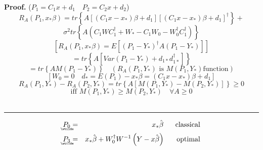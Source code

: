 \documentclass{article}
\newenvironment{proof}[1][Proof]{\noindent\textbf{#1.} }{\ \rule{0.5em}{0.5em}}
\begin{document}
\begin{proof}
($P_{1}=C_{1}x+d_{1}\quad P_{2}=C_{2}x+d_{2}$)%
\begin{equation*}
R_{A}\left( P_{1},x_{\ast }\beta \right) =tr\left\{ A\left[ \left(
C_{1}x-x_{\ast }\right) \beta +d_{1}\right] \left[ \left( C_{1}x-x_{\ast
}\right) \beta +d_{1}\right] ^{\dagger }\right\} +
\end{equation*}%
\begin{equation*}
\sigma ^{2}tr\left\{ A\left( C_{1}WC_{1}^{\dagger }+W_{\ast
}-C_{1}W_{0}-W_{0}^{\dagger }C_{1}^{\dagger }\right) \right\}
\end{equation*}%
\begin{equation*}
\left[ R_{A}\left( P_{1},x_{\ast }\beta \right) =E\left[ \left(
P_{1}-Y_{\ast }\right) ^{\dagger }A\left( P_{1}-Y_{\ast }\right) \right] %
\right]
\end{equation*}%
\begin{equation*}
=tr\left\{ A\left[ Var\left( P_{1}-Y_{\ast }\right) +d_{1\ast }d_{1\ast
}^{\dagger }\right] \right\}
\end{equation*}%
\begin{equation*}
=tr\left\{ AM\left( P_{1}-Y_{\ast }\right) \right\} \quad \left( R_{A}\left(
P_{1},Y_{\ast }\right) \text{ is }M\left( P_{1},Y_{\ast }\right) \text{
function}\right)
\end{equation*}%
\begin{equation*}
\left[ W_{0}=0\quad d_{\ast }=E\left( P_{1}\right) -x_{\ast }\beta =\left(
C_{1}x-x_{\ast }\right) \beta +d_{1}\right]
\end{equation*}%
\begin{equation*}
R_{A}\left( P_{1},Y_{\ast }\right) -R_{A}\left( P_{2},Y_{\ast }\right)
=tr\left\{ A\left[ M\left( P_{1},Y_{\ast }\right) -M\left( P_{2},Y_{\ast
}\right) \right] \right\} \geq 0
\end{equation*}%
\begin{equation*}
\text{iff }M\left( P_{1},Y_{\ast }\right) \geq M\left( P_{2},Y_{\ast
}\right) \quad \forall A\geq 0
\end{equation*}
\end{proof}

\bigskip

\begin{eqnarray*}
\underaccent{\wtilde}{P}%
_{0} &=&x_{\ast }\hat{\beta}\quad \text{classical} \\
\underaccent{\wtilde}{P}%
_{3} &=&x_{\ast }\hat{\beta}+W_{0}^{\dagger }W^{-1}\left( Y-x\hat{\beta}%
\right) \quad \text{optimal}
\end{eqnarray*}
\end{document}
